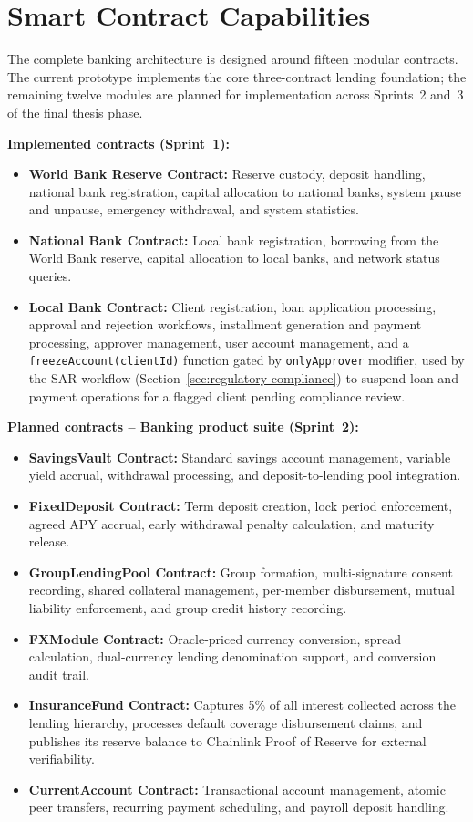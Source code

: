 \documentclass[12pt,a4paper]{report}
\begin{document}
\chapter{Smart Contract Capabilities}

The complete banking architecture is designed around fifteen modular contracts. The current prototype implements the core three-contract lending foundation; the remaining twelve modules are planned for implementation across Sprints~2 and~3 of the final thesis phase.

\textbf{Implemented contracts (Sprint~1):}
\begin{itemize}[noitemsep]
\item \textbf{World Bank Reserve Contract:} Reserve custody, deposit handling, national bank registration, capital allocation to national banks, system pause and unpause, emergency withdrawal, and system statistics.
\item \textbf{National Bank Contract:} Local bank registration, borrowing from the World Bank reserve, capital allocation to local banks, and network status queries.
\item \textbf{Local Bank Contract:} Client registration, loan application processing, approval and rejection workflows, installment generation and payment processing, approver management, user account management, and a \texttt{freezeAccount(clientId)} function gated by \texttt{onlyApprover} modifier, used by the SAR workflow (Section~\ref{sec:regulatory-compliance}) to suspend loan and payment operations for a flagged client pending compliance review.
\end{itemize}

\textbf{Planned contracts -- Banking product suite (Sprint~2):}
\begin{itemize}[noitemsep]
\item \textbf{SavingsVault Contract:} Standard savings account management, variable yield accrual, withdrawal processing, and deposit-to-lending pool integration.
\item \textbf{FixedDeposit Contract:} Term deposit creation, lock period enforcement, agreed APY accrual, early withdrawal penalty calculation, and maturity release.
\item \textbf{GroupLendingPool Contract:} Group formation, multi-signature consent recording, shared collateral management, per-member disbursement, mutual liability enforcement, and group credit history recording.
\item \textbf{FXModule Contract:} Oracle-priced currency conversion, spread calculation, dual-currency lending denomination support, and conversion audit trail.
\item \textbf{InsuranceFund Contract:} Captures 5\% of all interest collected across the lending hierarchy, processes default coverage disbursement claims, and publishes its reserve balance to Chainlink Proof of Reserve for external verifiability.
\item \textbf{CurrentAccount Contract:} Transactional account management, atomic peer transfers, recurring payment scheduling, and payroll deposit handling.
\end{itemize}
\end{document}
